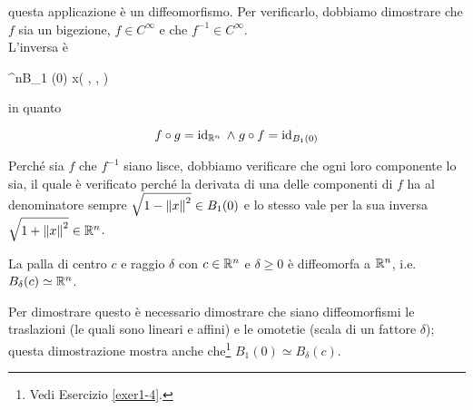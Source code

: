 questa applicazione è un diffeomorfismo. Per verificarlo, dobbiamo dimostrare che $ f $ sia un bigezione, $ f \in C^{\infty} $ e che $ f^{-1} \in C^{\infty} $. \\
L'inversa è

	{\R^{n}}{B_{1} (0)}
	{x}{\left( , \cdots,  \right)}

in quanto

\begin{equation}
	f \circ g = \operatorname{id}_{\mathbb{R}^{n}} \; \wedge \; g \circ f = \operatorname{id}_{B_{1} (0)}
\end{equation}

Perché sia $ f $ che $ f^{-1} $ siano lisce, dobbiamo verificare che ogni loro componente lo sia, il quale è verificato perché la derivata di una delle componenti di $ f $ ha al denominatore sempre $ \sqrt{1 - \norm{x}^{2}} \in B_{1} (0) $ e lo stesso vale per la sua inversa $ \sqrt{1 + \norm{x}^{2}} \in \mathbb{R}^{n} $.

\begin{corollary}
	La palla di centro $ c $ e raggio $ \delta $ con $ c \in \mathbb{R}^{n} $ e $ \delta \geqslant 0 $ è diffeomorfa a $ \mathbb{R}^{n} $, i.e. $ B_{\delta} (c) \simeq \mathbb{R}^{n} $.
\end{corollary}

Per dimostrare questo è necessario dimostrare che siano diffeomorfismi le traslazioni (le quali sono lineari e affini) e le omotetie (scala di un fattore $ \delta $); questa dimostrazione mostra anche che\footnote{%
	Vedi Esercizio \ref{exer1-4}.%
} $ B_{1} (0) \simeq B_{\delta} (c) $.


